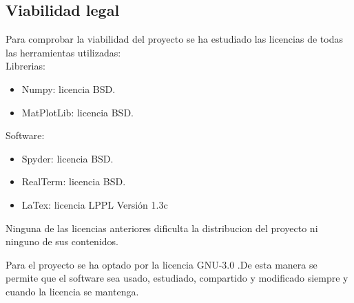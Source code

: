 \subsection{Viabilidad legal}

Para comprobar la viabilidad del proyecto se ha estudiado las licencias de todas las herramientas utilizadas:\\

Librerias:\\
\begin{itemize}
	\item Numpy: licencia BSD.
	\item MatPlotLib: licencia BSD.
\end{itemize}
Software:\\
\begin{itemize}
	\item Spyder: licencia BSD.
	\item RealTerm: licencia BSD.
	\item LaTex: licencia LPPL Versión 1.3c
\end{itemize}

Ninguna de las licencias anteriores dificulta la distribucion del proyecto ni ninguno de sus contenidos.

Para el proyecto se ha optado por la licencia GNU-3.0 \cite{misc:gnu}.De esta manera se permite que el software sea usado, estudiado, compartido y modificado siempre y cuando la licencia se mantenga.





